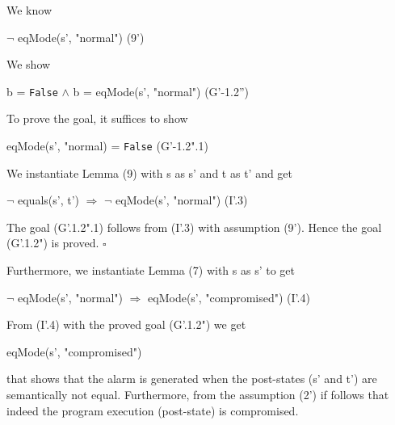 \documentclass[conference]{IEEEtran}
\begin{document}
\noindent We know

\begin{center}
$\neg$ eqMode(s', "normal")  \hspace*{2cm} (9')
\end{center}

\noindent We show

\begin{center}
 b = \texttt{False} $\wedge$ b = eqMode(s', "normal")  \hspace*{1cm} (G'-1.2'')
\end{center}

\noindent To prove the goal, it suffices to show

\begin{center}
eqMode(s', "normal) = \texttt{False}  \hspace*{2.3cm} (G'-1.2".1)
\end{center}

\noindent We instantiate Lemma (9) with
s as s' and t as t' and get

\begin{center}
$\neg$ equals(s', t') $\Rightarrow$ $\neg$ eqMode(s', "normal")  \hspace*{1cm} (I'.3)
\end{center}

The goal (G'.1.2".1) follows from (I'.3) with assumption (9'). Hence the goal (G'.1.2") is proved. $\square$

\noindent Furthermore, we instantiate Lemma (7) with
s as s' to get

\begin{center}
$\neg$ eqMode(s', "normal") $\Rightarrow$ eqMode(s', "compromised")  \hspace*{0cm} (I'.4)
\end{center}

\noindent From (I'.4) with the proved goal (G'.1.2") we get

\begin{center}
eqMode(s', "compromised")
\end{center}

that shows that the alarm is generated when the post-states (s' and t') are semantically not equal. Furthermore, from the assumption (2') if follows that indeed the program execution (post-state) is compromised.
\end{document}
